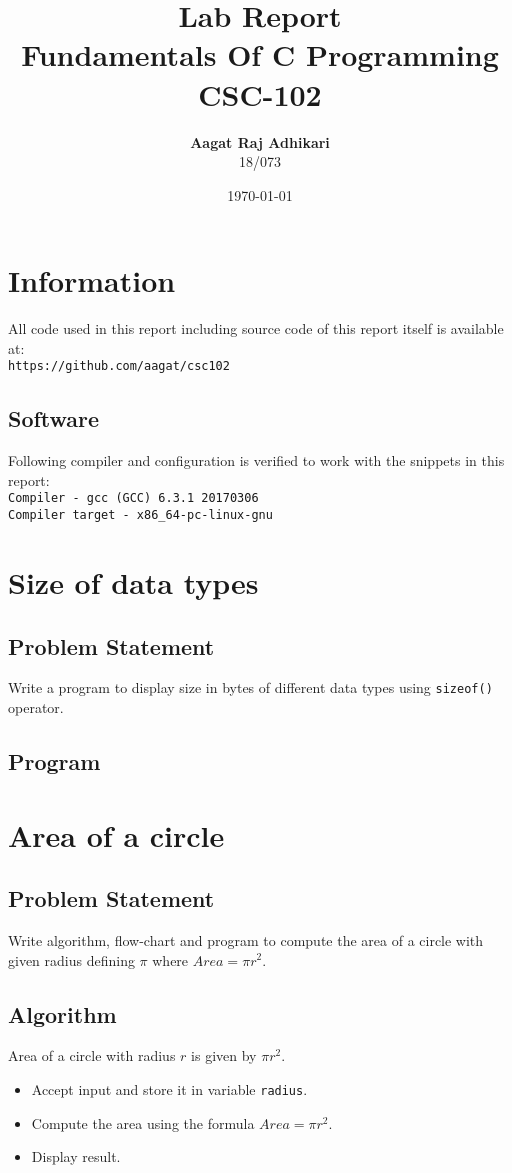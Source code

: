 \documentclass[11pt]{report}
\title{Lab Report \\
      \textbf{Fundamentals Of C Programming} \\
      CSC-102}
\author{\textbf{Aagat Raj Adhikari} \\ 18/073}
\date{\today}
\begin{document}
\maketitle

\chapter*{Information}
All code used in this report including source code of this report itself is available at:\\ \texttt{https://github.com/aagat/csc102}
\section*{Software}
Following compiler and configuration is verified to work with the snippets in this report:\\
\texttt{Compiler - gcc (GCC) 6.3.1 20170306\\
Compiler target - x86\_64-pc-linux-gnu
}

\tableofcontents

\chapter{Size of data types}
\section{Problem Statement}
Write a program to display size in bytes of different data types using \texttt{sizeof()} operator.
\section{Program}



\chapter{Area of a circle}
\section{Problem Statement}
Write algorithm, flow-chart and program to compute the area of a circle with given radius defining $\pi$ where $Area = \pi r^2$.
\section{Algorithm}
Area of a circle with radius $r$ is given by $\pi r^2$.
\begin{itemize}
\item Accept input and store it in variable \texttt{radius}.
\item Compute the area using the formula $Area = \pi r^2$.
\item Display result.
\end{itemize}
\end{document}
